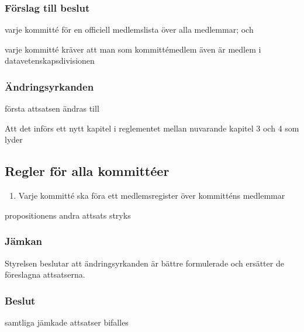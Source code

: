 \documentclass[protokoll]{dvd}
\begin{document}
    \subsubsection*{Förslag till beslut}
    \begin{attsatser}
        \item varje kommitté för en officiell medlemslista över alla medlemmar; och
        \item varje kommitté kräver att man som kommittémedlem även är medlem i datavetenskapsdivisionen
    \end{attsatser}

    \subsubsection*{Ändringsyrkanden}
    \begin{attsatser}
        \item första attsatsen ändras till
        \begin{displayquote}
            Att det införs ett nytt kapitel i reglementet mellan nuvarande kapitel 3 och 4 som lyder

            \subsection*{Regler för alla kommittéer}
            \begin{enumerate}[label=\arabic* §]
                \item Varje kommitté ska föra ett medlemsregister över kommitténs medlemmar
            \end{enumerate}
        \end{displayquote}

    \item propositionens andra attsats stryks
    \end{attsatser}

    \subsubsection*{Jämkan}
    Styrelsen beslutar att ändringsyrkanden är bättre formulerade och ersätter de föreslagna attsatserna.

    \subsubsection*{Beslut}
    \begin{attsatser}
        \item samtliga jämkade attsatser bifalles
    \end{attsatser}
\end{document}
